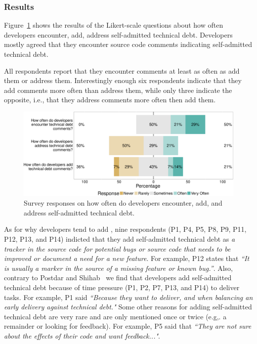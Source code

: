 \subsubsection*{Results} 
Figure~\ref{fig:encouner_add_address} shows the results of the Likert-scale questions about how often developers encounter, add, address self-admitted technical debt. Developers mostly agreed that they encounter source code comments indicating self-admitted technical debt. 




All respondents report that they encounter \SATD comments at least as often as add them or address them. Interestingly enough six respondents indicate that they add \SATD comments more often than address them, while only three indicate the opposite, i.e., that they address \SATD comments more often then add them.


 
 \begin{figure}[t]
 	\centering
 	\includegraphics[width=0.95\columnwidth]{figures/test/_responses_question_.pdf}
 	\caption{Survey responses on how often do developers encounter, add, and address self-admitted technical debt.}
 	\label{fig:encouner_add_address}
 \end{figure}


As for why developers tend to add \SATD, nine respondents (P1, P4, P5, P8, P9, P11, P12, P13, and P14) indicted that they add self-admitted technical debt as \emph{a tracker in the source code for potential bugs or source code that needs to be improved or document a need for a new feature}. For example, P12 states that \textit{``It is usually a marker in the source of a missing feature or known bug.''}. Also, contrary to Postdar and Shihab~\cite{Potdar2014ICSME} we find that developers add self-admitted technical debt because of time pressure (P1, P2, P7, P13, and P14) to deliver tasks. For example, P1 said \textit{``Because they want to deliver, and when balancing an early delivery against technical debt."} Some other reasons for adding self-admitted technical debt are very rare and are only mentioned once or twice (e.g,. a remainder or looking for feedback). For example, P5 said that \textit{``They are not sure about the effects of their code and want feedback..."}.

